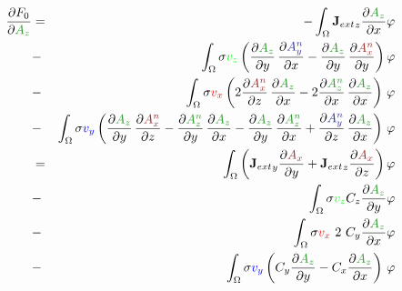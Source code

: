\documentclass[smallextended]{svjour3}       %
\begin{document}
			\begin{eqnarray}
			\frac{\partial F_0}{\partial \textcolor{darkgre}{A_z}} & = &
			-\int_{\Omega} {\mathbf{J}_{ext}}_z \frac{\partial \textcolor{darkgre}{A_z}}{\partial x} \varphi
			\nonumber \\
			& - & \int_{\Omega} \sigma \textcolor{gre}{v_z} \left(\frac{\partial \textcolor{darkgre}{A_z}}{\partial y}\,\frac{\partial \textcolor{darkblu}{A_y^n}}{\partial x} - \frac{\partial \textcolor{darkgre}{A_z}}{\partial y}\,\frac{\partial \textcolor{darkred}{A_x^n}}{\partial y}\right) \varphi \nonumber \\			
			& - & \int_{\Omega} \sigma \textcolor{red}{v_x} \left( 2 \frac{\partial \textcolor{darkred}{A_x^n}}{\partial z}\,\frac{\partial \textcolor{darkgre}{A_z}}{\partial x} - 2 \frac{\partial \textcolor{darkgre}{A_z^n}}{\partial x}\,\frac{\partial \textcolor{darkgre}{A_z}}{\partial x} \right)\, \varphi \nonumber \\			
			& - & \int_{\Omega} \sigma \textcolor{blu}{v_y} \left(\frac{\partial \textcolor{darkgre}{A_z}}{\partial y}\,\frac{\partial \textcolor{darkred}{A_x^n}}{\partial z} - \frac{\partial \textcolor{darkgre}{A_z^n}}{\partial y}\,\frac{\partial \textcolor{darkgre}{A_z}}{\partial x} - \frac{\partial \textcolor{darkgre}{A_z}}{\partial y}\,\frac{\partial \textcolor{darkgre}{A_z^n}}{\partial x} + \frac{\partial \textcolor{darkblu}{A_y^n}}{\partial z}\,\frac{\partial \textcolor{darkgre}{A_z}}{\partial x} \right)\, \varphi\\
			 & = &
			\int_{\Omega} \left({\mathbf{J}_{ext}}_y \frac{\partial \textcolor{darkred}{A_x}}{\partial y} + {\mathbf{J}_{ext}}_z \frac{\partial \textcolor{darkred}{A_x}}{\partial z}\right) \varphi			
			\nonumber \\
			& - &\int_{\Omega} \sigma  \textcolor{gre}{v_z}    C_z \frac{\partial \textcolor{darkgre}{A_z}}{\partial y} \varphi \nonumber \\			
			& - & \int_{\Omega} \sigma \textcolor{red}{v_x}\ 2\ C_y \frac{\partial \textcolor{darkgre}{A_z}}{\partial x} \varphi \nonumber \\			
			& - & \int_{\Omega} \sigma \textcolor{blu}{v_y} \left( C_y \frac{\partial \textcolor{darkgre}{A_z}}{\partial y} - C_x \frac{\partial \textcolor{darkgre}{A_z}}{\partial x}\right)\, \varphi
		\end{eqnarray}
		
\end{document}
